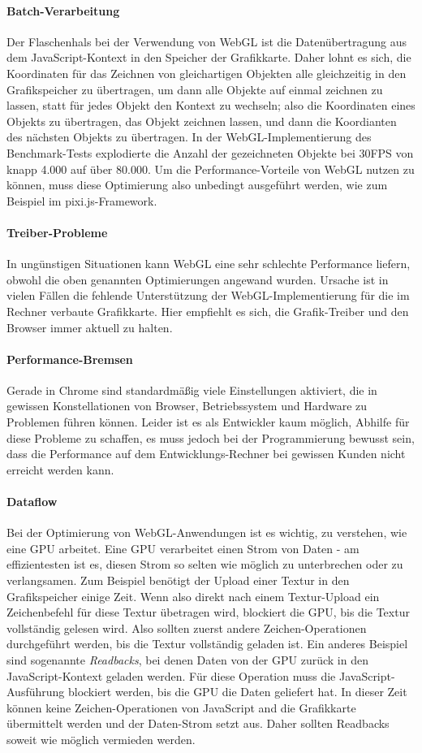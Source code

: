 \documentclass[a4paper, 12pt]{article}
\begin{document}
\paragraph{Batch-Verarbeitung} Der Flaschenhals bei der Verwendung von WebGL ist die Datenübertragung aus dem JavaScript-Kontext in den Speicher der Grafikkarte. Daher lohnt es sich, die Koordinaten für das Zeichnen von gleichartigen Objekten alle gleichzeitig in den Grafikspeicher zu übertragen, um dann alle Objekte auf einmal zeichnen zu lassen, statt für jedes Objekt den Kontext zu wechseln; also die Koordinaten eines Objekts zu übertragen, das Objekt zeichnen lassen, und dann die Koordianten des nächsten Objekts zu übertragen. In der WebGL-Implementierung des Benchmark-Tests explodierte die Anzahl der gezeichneten Objekte bei 30FPS von knapp 4.000 auf über 80.000. Um die Performance-Vorteile von WebGL nutzen zu können, muss diese Optimierung also unbedingt ausgeführt werden, wie zum Beispiel im pixi.js-Framework.\cite{WebGLPerformance}
\paragraph{Treiber-Probleme} In ungünstigen Situationen kann WebGL eine sehr schlechte Performance liefern, obwohl die oben genannten Optimierungen angewand wurden. Ursache ist in vielen Fällen die fehlende Unterstützung der WebGL-Implementierung für die im Rechner verbaute Grafikkarte. Hier empfiehlt es sich, die Grafik-Treiber und den Browser immer aktuell zu halten.\cite{WebGLPerformance}
\paragraph{Performance-Bremsen} Gerade in Chrome sind standardmäßig viele Einstellungen aktiviert, die in gewissen Konstellationen von Browser, Betriebssystem und Hardware zu Problemen führen können. Leider ist es als Entwickler kaum möglich, Abhilfe für diese Probleme zu schaffen, es muss jedoch bei der Programmierung bewusst sein, dass die Performance auf dem Entwicklungs-Rechner bei gewissen Kunden nicht erreicht werden kann.
\paragraph{Dataflow} Bei der Optimierung von WebGL-Anwendungen ist es wichtig, zu verstehen, wie eine GPU arbeitet. Eine GPU verarbeitet einen Strom von Daten - am effizientesten ist es, diesen Strom so selten wie möglich zu unterbrechen oder zu verlangsamen. Zum Beispiel benötigt der Upload einer Textur in den Grafikspeicher einige Zeit. Wenn also direkt nach einem Textur-Upload ein Zeichenbefehl für diese Textur übetragen wird, blockiert die GPU, bis die Textur vollständig gelesen wird. Also sollten zuerst andere Zeichen-Operationen durchgeführt werden, bis die Textur vollständig geladen ist. Ein anderes Beispiel sind sogenannte \emph{Readbacks}, bei denen Daten von der GPU zurück in den JavaScript-Kontext geladen werden. Für diese Operation muss die JavaScript-Ausführung blockiert werden, bis die GPU die Daten geliefert hat. In dieser Zeit können keine Zeichen-Operationen von JavaScript and die Grafikkarte übermittelt werden und der Daten-Strom setzt aus. Daher sollten Readbacks soweit wie möglich vermieden werden.\cite{WebGLPerformance}
\end{document}
